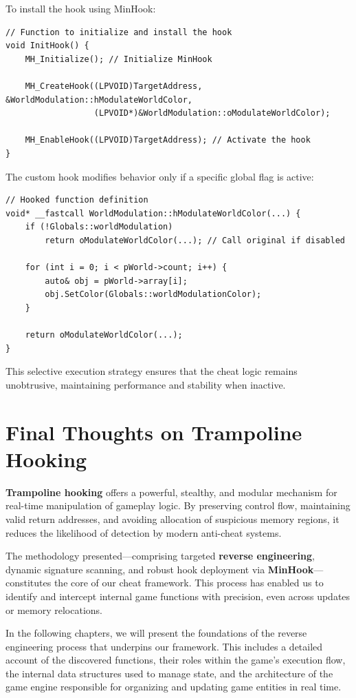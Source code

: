 To install the hook using MinHook:

\begin{lstlisting}[style=cppstyle]
// Function to initialize and install the hook
void InitHook() {
    MH_Initialize(); // Initialize MinHook

    MH_CreateHook((LPVOID)TargetAddress, &WorldModulation::hModulateWorldColor, 
                  (LPVOID*)&WorldModulation::oModulateWorldColor);

    MH_EnableHook((LPVOID)TargetAddress); // Activate the hook
}
\end{lstlisting}


\newpage

The custom hook modifies behavior only if a specific global flag is active:

\begin{lstlisting}[style=cppstyle]
// Hooked function definition
void* __fastcall WorldModulation::hModulateWorldColor(...) {
    if (!Globals::worldModulation)
        return oModulateWorldColor(...); // Call original if disabled

    for (int i = 0; i < pWorld->count; i++) {
        auto& obj = pWorld->array[i];
        obj.SetColor(Globals::worldModulationColor);
    }

    return oModulateWorldColor(...);
}
\end{lstlisting}

This selective execution strategy ensures that the cheat logic remains unobtrusive, maintaining performance and stability when inactive.

\section{Final Thoughts on Trampoline Hooking}

\textbf{Trampoline hooking} offers a powerful, stealthy, and modular mechanism for real-time manipulation of gameplay logic.  
By preserving control flow, maintaining valid return addresses, and avoiding allocation of suspicious memory regions, it reduces the likelihood of detection by modern anti-cheat systems.

The methodology presented—comprising targeted \textbf{reverse engineering}, dynamic signature scanning, and robust hook deployment via \textbf{MinHook}—constitutes the core of our cheat framework.  
This process has enabled us to identify and intercept internal game functions with precision, even across updates or memory relocations.


In the following chapters, we will present the foundations of the reverse engineering process that underpins our framework. This includes a detailed account of the discovered functions, their roles within the game's execution flow, the internal data structures used to manage state, and the architecture of the game engine responsible for organizing and updating game entities in real time.